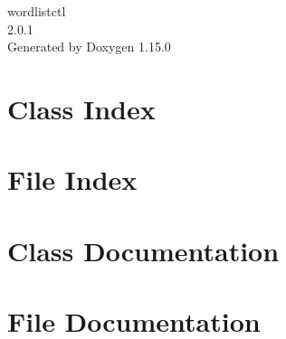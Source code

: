 \documentclass[twoside]{book}
\newcommand{\+}{\discretionary{\mbox{\scriptsize$\hookleftarrow$}}{}{}}
\newcommand{\clearemptydoublepage}{%
    \newpage{\pagestyle{empty}\cleardoublepage}%
  }
\begin{document}
  \raggedbottom
    \hypersetup{pageanchor=false,
                bookmarksnumbered=true,
                pdfencoding=unicode
               }
  \begin{titlepage}
  \vspace*{7cm}
  \begin{center}%
  {\Large wordlistctl}\\
  [1ex]\large 2.\+0.\+1 \\
  \vspace*{1cm}
  {\large Generated by Doxygen 1.15.0}\\
  \end{center}
  \end{titlepage}
  \clearemptydoublepage
  \tableofcontents
  \clearemptydoublepage
  \hypersetup{pageanchor=true}

\chapter{Class Index}

\chapter{File Index}

\chapter{Class Documentation}



\chapter{File Documentation}




  \backmatter
  \newpage
  \clearemptydoublepage
  \printindex
\end{document}
